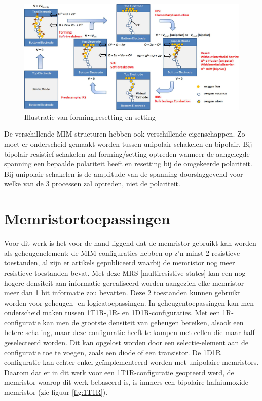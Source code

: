 \begin{figure}
  \centering
  \includegraphics[scale=0.22]{../fig/hfdstk-cel-forming-reset-set.png}
  \caption{Illustratie van forming,resetting en setting\cite{Won12}}
  \label{fig:forming-reset-set}
\end{figure}

De verschillende MIM-structuren hebben ook verschillende eigenschappen. Zo moet er onderscheid gemaakt worden tussen unipolair schakelen en bipolair. Bij bipolair resistief schakelen zal forming/setting optreden wanneer de aangelegde spanning een bepaalde polariteit heeft en resetting bij de omgekeerde polariteit. Bij unipolair schakelen is de amplitude van de spanning doorslaggevend voor welke van de 3 processen zal optreden, niet de polariteit. 


\section{Memristortoepassingen}

Voor dit werk is het voor de hand liggend dat de memristor gebruikt kan worden als geheugenelement: de MIM-configuraties hebben op z'n minst 2 resistieve toestanden, al zijn er artikels gepubliceerd waarbij de memristor nog meer resistieve toestanden bevat\cite{Liu12}. Met deze MRS [multiresistive states] kan een nog hogere densiteit aan informatie gerealiseerd worden aangezien elke memristor meer dan 1 bit informatie zou bevatten.
Deze 2 toestanden kunnen gebruikt worden voor geheugen- en logicatoepassingen\cite{ros12}\cite{raj09}. In geheugentoepassingen kan men onderscheid maken tussen 1T1R-,1R- en 1D1R-configuraties\cite{Den13}. Met een 1R-configuratie kan men de grootste densiteit van geheugen bereiken, alsook een betere schaling, maar deze configuratie heeft te kampen met cellen die maar half geselecteerd worden. Dit kan opgelost worden door een selectie-element aan de configuratie toe te voegen, zoals een diode of een transistor. De 1D1R configuratie kan echter enkel geïmplementeerd worden met unipolaire memristors\cite{Wou09}. Daarom dat er in dit werk voor een 1T1R-configuratie geopteerd werd, de memristor waarop dit werk bebaseerd is, is immers een bipolaire hafniumoxide-memristor (zie figuur \ref{fig:1T1R}).

